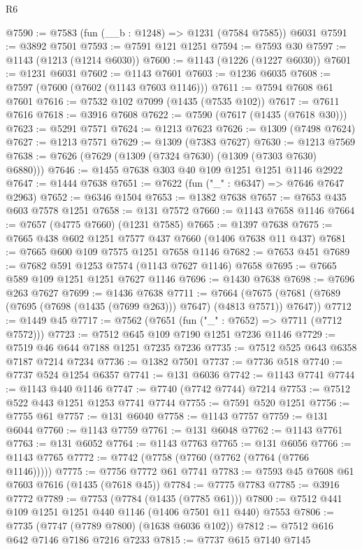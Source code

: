 \begin{lexlean}{R6}
\begin{coremodule}
@7590 := @7583 (fun (__b : @1248) => @1231 (@7584 @7585)) @6031
@7591 := @3892 @7501
@7593 := @7591 @121 @1251
@7594 := @7593 @30
@7597 := @1143 (@1213 (@1214 @6030))
@7600 := @1143 (@1226 (@1227 @6030))
@7601 := @1231 @6031
@7602 := @1143 @7601
@7603 := @1236 @6035
@7608 := @7597 (@7600 (@7602 (@1143 @7603 @1146)))
@7611 := @7594 @7608 @61 @7601
@7616 := @7532 @102 @7099 (@1435 (@7535 @102))
@7617 := @7611 @7616
@7618 := @3916 @7608
@7622 := @7590 (@7617 (@1435 (@7618 @30)))
@7623 := @5291 @7571
@7624 := @1213 @7623
@7626 := @1309 (@7498 @7624)
@7627 := @1213 @7571
@7629 := @1309 (@7383 @7627)
@7630 := @1213 @7569
@7638 := @7626 (@7629 (@1309 (@7324 @7630) (@1309 (@7303 @7630) @6880)))
@7646 := @1455 @7638 @303 @40 @109 @1251 @1251 @1146 @2922
@7647 := @1444 @7638
@7651 := @7622 (fun ("_" : @6347) => @7646 @7647 @2963)
@7652 := @6346 @1504
@7653 := @1382 @7638
@7657 := @7653 @435 @603 @7578 @1251
@7658 := @131 @7572
@7660 := @1143 @7658 @1146
@7664 := @7657 (@4775 @7660) (@1231 @7585)
@7665 := @1397 @7638
@7675 := @7665 @438 @602 @1251 @7577 @437 @7660 (@1406 @7638 @11 @437)
@7681 := @7665 @600 @109 @7575 @1251 @7658 @1146
@7682 := @7653 @451
@7689 := @7682 @591 @1253 @7574 (@1143 @7627 @1146) @7658
@7695 := @7665 @589 @109 @1251 @1251 @7627 @1146
@7696 := @1430 @7638
@7698 := @7696 @263 @7627
@7699 := @1436 @7638
@7711 := @7664
    (@7675 (@7681 (@7689 (@7695 (@7698 (@1435 (@7699 @263))) @7647) (@4813 @7571)) @7647))
@7712 := @1449 @45
@7717 := @7562 (@7651 (fun ("_" : @7652) => @7711 (@7712 @7572)))
@7723 := @7512 @645 @109 @7190 @1251 @7236 @1146
@7729 := @7519 @46 @644 @7188 @1251 @7235 @7236
@7735 := @7512 @525 @643 @6358 @7187 @7214 @7234
@7736 := @1382 @7501
@7737 := @7736 @518
@7740 := @7737 @524 @1254 @6357
@7741 := @131 @6036
@7742 := @1143 @7741
@7744 := @1143 @440 @1146
@7747 := @7740 (@7742 @7744) @7214
@7753 := @7512 @522 @443 @1251 @1253 @7741 @7744
@7755 := @7591 @520 @1251
@7756 := @7755 @61
@7757 := @131 @6040
@7758 := @1143 @7757
@7759 := @131 @6044
@7760 := @1143 @7759
@7761 := @131 @6048
@7762 := @1143 @7761
@7763 := @131 @6052
@7764 := @1143 @7763
@7765 := @131 @6056
@7766 := @1143 @7765
@7772 := @7742 (@7758 (@7760 (@7762 (@7764 (@7766 @1146)))))
@7775 := @7756 @7772 @61 @7741
@7783 := @7593 @45 @7608 @61 @7603 @7616 (@1435 (@7618 @45))
@7784 := @7775 @7783
@7785 := @3916 @7772
@7789 := @7753 (@7784 (@1435 (@7785 @61)))
@7800 := @7512 @441 @109 @1251 @1251 @440 @1146 (@1406 @7501 @11 @440) @7553
@7806 := @7735 (@7747 (@7789 @7800) (@1638 @6036 @102))
@7812 := @7512 @616 @642 @7146 @7186 @7216 @7233
@7815 := @7737 @615 @7140 @7145

\end{coremodule}
\end{lexlean}
